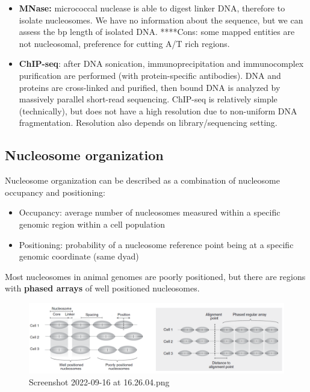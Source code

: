 \begin{itemize}
\tightlist
\item
  \textbf{MNase:} micrococcal nuclease is able to digest linker DNA, therefore to isolate nucleosomes. We have no information about the sequence, but we can assess the bp length of isolated DNA. ****Cons: some mapped entities are not nucleosomal, preference for cutting A/T rich regions.
\item
  \textbf{ChIP-seq}: after DNA sonication, immunoprecipitation and immunocomplex purification are performed (with protein-specific antibodies). DNA and proteins are cross-linked and purified, then bound DNA is analyzed by massively parallel short-read sequencing. ChIP-seq is relatively simple (technically), but does not have a high resolution due to non-uniform DNA fragmentation. Resolution also depends on library/sequencing setting.
\end{itemize}

\hypertarget{nucleosome-organization}{%
\subsection{Nucleosome organization}\label{nucleosome-organization}}

Nucleosome organization can be described as a combination of nucleosome occupancy and positioning:

\begin{itemize}
\tightlist
\item
  Occupancy: average number of nucleosomes measured within a specific genomic region within a cell population
\item
  Positioning: probability of a nucleosome reference point being at a specific genomic coordinate (same dyad)
\end{itemize}

Most nucleosomes in animal genomes are poorly positioned, but there are regions with \textbf{phased arrays} of well positioned nucleosomes.

\begin{figure}
\centering
\includegraphics[width=\textwidth]{../_resources/Screenshot_2022-09-16_at_16-26-04.png}
\caption{Screenshot 2022-09-16 at 16.26.04.png}
\end{figure}

